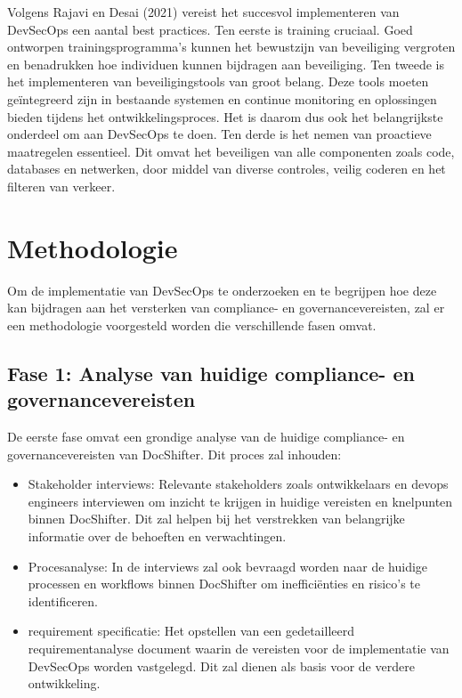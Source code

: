 \documentclass{hogent-article}
\begin{document}
   Volgens Rajavi en Desai (2021) vereist het succesvol implementeren van DevSecOps een aantal best practices. Ten eerste is training cruciaal. Goed ontworpen trainingsprogramma's kunnen het bewustzijn van beveiliging vergroten en benadrukken hoe individuen kunnen bijdragen aan beveiliging. Ten tweede is het implementeren van beveiligingstools van groot belang. Deze tools moeten geïntegreerd zijn in bestaande systemen en continue monitoring en oplossingen bieden tijdens het ontwikkelingsproces. Het is daarom dus ook het belangrijkste onderdeel om aan DevSecOps te doen. Ten derde is het nemen van proactieve maatregelen essentieel. Dit omvat het beveiligen van alle componenten zoals code, databases en netwerken, door middel van diverse controles, veilig coderen en het filteren van verkeer. \autocite{RajaviDesai2021}
    
    \section{Methodologie}%
    \label{sec:methodologie}
    
    \noindent Om de implementatie van DevSecOps te onderzoeken en te begrijpen hoe deze kan bijdragen aan het versterken van compliance- en governancevereisten, zal er een methodologie voorgesteld worden die verschillende fasen omvat. 
    
    \subsection{Fase 1: Analyse van huidige compliance- en governancevereisten}
    \noindent De eerste fase omvat een grondige analyse van de huidige compliance- en governancevereisten van DocShifter. Dit proces zal inhouden:
    
    \begin{itemize}
        \item Stakeholder interviews: Relevante stakeholders zoals ontwikkelaars en devops engineers interviewen om inzicht te krijgen in huidige vereisten en knelpunten binnen DocShifter. Dit zal helpen bij het verstrekken van belangrijke informatie over de behoeften en verwachtingen.
        \item Procesanalyse: In de interviews zal ook bevraagd worden naar de huidige processen en workflows binnen DocShifter om inefficiënties en risico's te identificeren.
        \item requirement specificatie: Het opstellen van een gedetailleerd requirementanalyse document waarin de vereisten voor de implementatie van DevSecOps worden vastgelegd. Dit zal dienen als basis voor de verdere ontwikkeling.
    \end{itemize}
    
\end{document}
